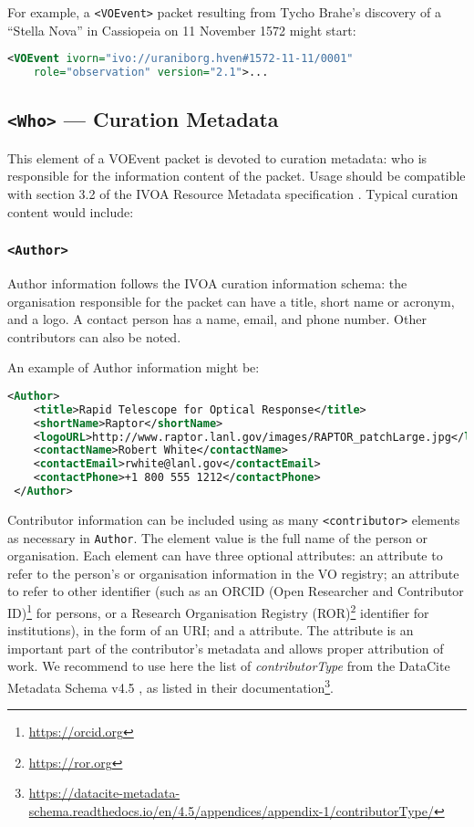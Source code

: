 \documentclass[11pt,a4paper]{ivoa}
\begin{document}
For example, a \verb|<VOEvent>| packet resulting from Tycho Brahe's discovery of
a ``Stella Nova'' in Cassiopeia on 11 November 1572 might start:
\begin{lstlisting}[language=XML]
<VOEvent ivorn="ivo://uraniborg.hven#1572-11-11/0001"
    role="observation" version="2.1">...
\end{lstlisting}

\subsection{\texttt{<Who>} --- Curation Metadata}
\label{sec:3.2}
This element of a VOEvent packet is devoted to curation metadata: who is
responsible for the information content of the packet. Usage should be
compatible with section 3.2 of the IVOA Resource Metadata specification
\citep{2007ivoa.spec.0302H}. Typical curation content would include:

\subsubsection{\texttt{<Author>}}
Author information follows the IVOA curation information schema: the
organisation responsible for the packet can have a title, short name or acronym,
and a logo. A contact person has a name, email, and phone number. Other
contributors can also be noted.

An example of Author information might be:
\begin{lstlisting}[language=XML]
<Author>
    <title>Rapid Telescope for Optical Response</title>
    <shortName>Raptor</shortName>
    <logoURL>http://www.raptor.lanl.gov/images/RAPTOR_patchLarge.jpg</logoURL>
    <contactName>Robert White</contactName>
    <contactEmail>rwhite@lanl.gov</contactEmail>
    <contactPhone>+1 800 555 1212</contactPhone>
 </Author>
\end{lstlisting}

Contributor information can be included using as many \verb|<contributor>|
elements as necessary in \verb|Author|. The element value is the full name of the person or
organisation. Each element can have three optional attributes: an 
attribute to refer to the person's or organisation information in the VO
registry; an  attribute to refer to other identifier (such
as an ORCID (Open Researcher and Contributor ID)\footnote{\url{https://orcid.org}}
for persons, or a Research Organisation Registry
(ROR)\footnote{\url{https://ror.org}} identifier for institutions), in the form
of an URI; and a  attribute. The  attribute is an important
part of the contributor's metadata and allows proper attribution of work. We
recommend to use here the list of \emph{contributorType} from the DataCite
Metadata Schema v4.5 \citep{https://doi.org/10.14454/g8e5-6293}, as listed in
their documentation\footnote{\url{https://datacite-metadata-schema.readthedocs.io/en/4.5/appendices/appendix-1/contributorType/}}.
\end{document}
